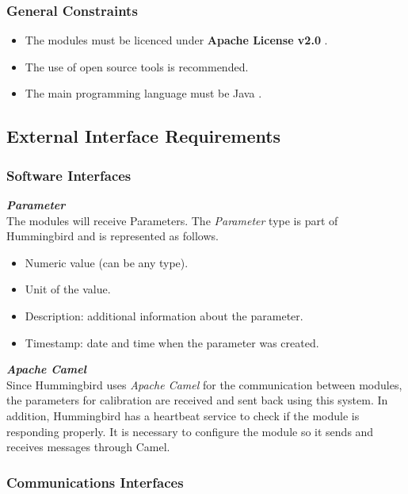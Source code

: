 \subsubsection{General Constraints}

\begin{itemize}
\item The modules must be licenced under \textbf{Apache License v2.0} \cite{AL20}.
\item The use of open source tools is recommended.
\item The main programming language must be Java \cite{Java}.
\end{itemize}

\subsection{External Interface Requirements}

\subsubsection{Software Interfaces}

\textbf{\emph{Parameter}}\\
The modules will receive Parameters. The \emph{Parameter} type is part of Hummingbird and is represented as follows.

\begin{itemize}
\item Numeric value (can be any type).
\item Unit of the value.
\item Description: additional information about the parameter.
\item Timestamp: date and time when the parameter was created.

\end{itemize}


\textbf{\emph{Apache Camel}} \citep{Camel}\\
Since Hummingbird uses \emph{Apache Camel} for the communication between modules, the parameters for calibration are received and sent back using this system. In addition, Hummingbird has a heartbeat service to check if the module is responding properly. It is necessary to configure the module so it sends and receives messages through Camel.


\subsubsection{Communications Interfaces}

